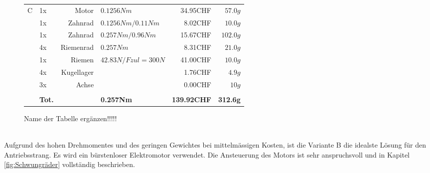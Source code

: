 \begin{figure}[h!]
\begin{tabular}{p{0.5cm}p{0.8cm}rp{3cm}rr}
    \multirow{9}[2]{*}{C} 
          & 1x    & Motor           & $0.1256 Nm$          & 34.95CHF & $57.0 g$ \\
          & 1x    & Zahnrad         & $0.1256 Nm / 0.11 Nm$& 8.02CHF  & $10.0 g$ \\
          & 1x    & Zahnrad         & $0.257 Nm / 0.96 Nm$ & 15.67CHF & $102.0 g$ \\
          & 4x    & Riemenrad       & $0.257 Nm$           & 8.31CHF  & $21.0 g$ \\
          & 1x    & Riemen          & $42.83 N / Fzul=300 N$ & 41.00CHF & $10.0 g$ \\
          & 4x    & Kugellager      &                      & 1.76CHF  & $4.9 g$ \\
          & 3x    & Achse           &                      & 0.00CHF  & $10 g$ \\
          &       &                 &                      &          &  \\
          & \textbf{Tot.} &       & \textbf{0.257Nm} & \textbf{139.92CHF} & \textbf{312.6g} \\
    \end{tabular}%
 	\centering
    \caption{Name der Tabelle ergänzen!!!!!}
    \label{tab:addlabel}%
\end{figure}\\
Aufgrund des hohen Drehmomentes und des geringen Gewichtes bei mittelmässigen Kosten, ist die Variante B die idealste Lösung für den Antriebsstrang. Es wird ein bürstenloser Elektromotor verwendet. Die Ansteuerung des Motors ist sehr anspruchsvoll und in Kapitel \ref{fig:Schwungräder} vollständig beschrieben.
